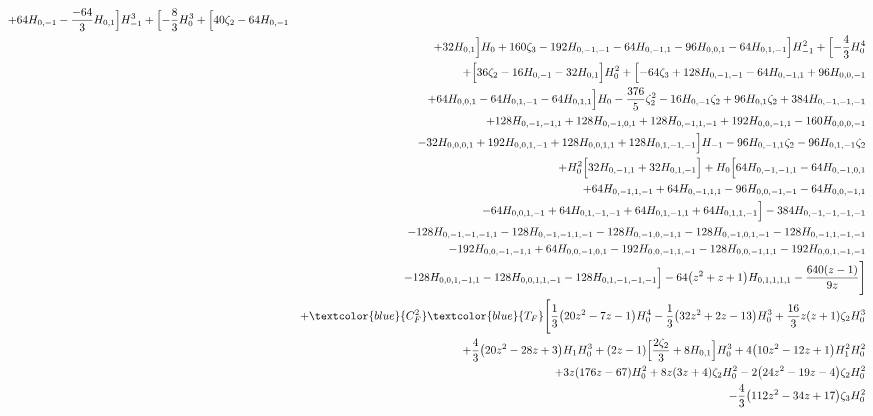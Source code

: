 \begin{eqnarray}
+64 H_{0,-1}-\frac{-64}{3}H_{0,1}\Bigr] H_{-1}^3+\Bigl[-\frac{8}{3} H_0^3+\Bigl[40\zeta_2-64 H_{0,-1}
\nonumber \\ &&
+32 H_{0,1}\Bigr] H_0+160 \zeta_3-192 H_{0,-1,-1}-64H_{0,-1,1}
-96  H_{0,0,1}-64 H_{0,1,-1}\Bigr] H_{-1}^2+\Bigl[-\frac{4}{3} H_0^4
\nonumber \\ &&
+\Bigl[36 \zeta_2-16 H_{0,-1}-32  H_{0,1}\Bigr] H_0^2+\Bigl[-64 \zeta_3+128 H_{0,-1,-1}
-64H_{0,-1,1}+96 H_{0,0,-1}
\nonumber \\ &&
+64 H_{0,0,1}-64 H_{0,1,-1}
-64 H_{0,1,1}\Bigr] H_0-\frac{376}{5}\zeta_2^2-16 H_{0,-1} \zeta_2
+96 H_{0,1} \zeta_2+384 H_{0,-1,-1,-1}
\nonumber \\ &&
+128H_{0,-1,-1,1}+128  H_{0,-1,0,1}
+128H_{0,-1,1,-1}+192  H_{0,0,-1,1}-160H_{0,0,0,-1}
\nonumber \\ &&
-32 H_{0,0,0,1}+192  H_{0,0,1,-1}+128 H_{0,0,1,1}
+128 H_{0,1,-1,-1}
\Bigr] H_{-1}
-96H_{0,-1,1} \zeta_2-96 H_{0,1,-1} \zeta_2
\nonumber \\ &&
+H_0^2\Bigl[32  H_{0,-1,1}
+32  H_{0,1,-1}\Bigr]+H_0 \Bigl[64 H_{0,-1,-1,1}-64 H_{0,-1,0,1}
\nonumber \\ &&
+64H_{0,-1,1,-1}
+64 H_{0,-1,1,1}-96 H_{0,0,-1,-1}-64H_{0,0,-1,1}
\nonumber \\ &&
-64 H_{0,0,1,-1}
+64 H_{0,1,-1,-1}
+64 H_{0,1,-1,1}
+64H_{0,1,1,-1}\Bigr]
-384 H_{0,-1,-1,-1,-1}
\nonumber \\ &&
-128H_{0,-1,-1,-1,1}
-128 H_{0,-1,-1,1,-1}
-128  H_{0,-1,0,-1,1}
-128 H_{0,-1,0,1,-1}-128 H_{0,-1,1,-1,-1}
\nonumber \\ &&
-192 H_{0,0,-1,-1,1}
+64  H_{0,0,-1,0,1}-192  H_{0,0,-1,1,-1}-128 H_{0,0,-1,1,1}
-192  H_{0,0,1,-1,-1}
\nonumber \\ &&
-128  H_{0,0,1,-1,1}
-128 H_{0,0,1,1,-1}-128 H_{0,1,-1,-1,-1}
\Bigr]
-64 \big(z^2+z+1\big) H_{0,1,1,1,1}
-\frac{640   (z-1)}{9 z}\Biggr]
\nonumber \\ &&
%
+\textcolor{blue}{C_F^2}  \textcolor{blue}{T_F}
\Biggl[\frac{1}{3} \big(20 z^2-7 z-1\big)H_0^4
-\frac{1}{3} \big(32 z^2+2 z-13\big) H_0^3
+\frac{16}{3}  z (z+1)\zeta_2 H_0^3
\nonumber \\ &&
+\frac{4}{3} \big(20 z^2-28 z+3\big) H_1 H_0^3
+(2 z-1)\Bigl[\frac{2 \zeta_2}{3}+8 H_{0,1}\Bigr] H_0^3
+4 \big(10 z^2-12 z+1\big)H_1^2 H_0^2
\nonumber \\ &&
+3 z (176 z-67) H_0^2
+8  z (3 z+4) \zeta_2 H_0^2
-2\big(24 z^2-19 z-4\big) \zeta_2 H_0^2
\nonumber \\ &&
-\frac{4}{3} \big(112 z^2-34z+17\big) \zeta_3 H_0^2

\end{eqnarray}

